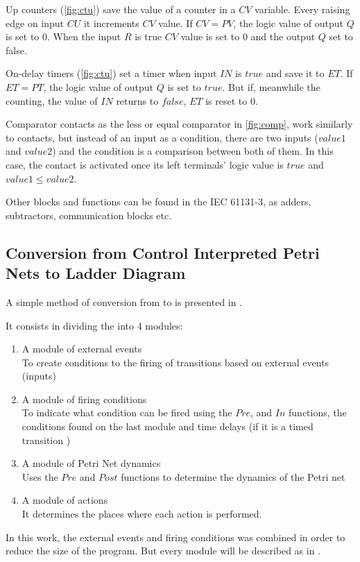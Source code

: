 Up counters (\autoref{fig:ctu}) save the value of a counter in a $CV$ variable. Every raising edge
on input $CU$ it increments $CV$ value. If $CV=PV$, the logic value of output $Q$ 
is set to $0$. When the input $R$ is true $CV$ value is set to $0$ and the
output $Q$ set to false.

On-delay timers (\autoref{fig:ctu}) set a timer when input $IN$ is $true$
and save it to $ET$. If $ET=PT$, the logic value of output $Q$ is set to $true$.
But if, meanwhile the counting, the value of $IN$ returns to $false$, $ET$ is reset to
$0$.

Comparator contacts as the less or equal comparator in \autoref{fig:comp}, work
similarly to contacts, but instead of an input as a condition, there are two
inputs ($value1$ and $value2$) and the condition is a comparison between both of
them. In this case, the contact is activated once its left terminals' logic
value is $true$ and $value1\leq value2$.

Other blocks and functions can be found in the IEC 61131-3, as adders,
subtractors, communication blocks etc.

\subsection{Conversion from Control Interpreted Petri Nets to Ladder Diagram}
\label{sec:cipnToLD}

A simple method of conversion from \CIPN{} to \LD{} is presented in
\cite{moreira2013bridging}.

It consists in dividing the \CIPN{} into 4 modules:
\begin{enumerate}
\item A module of external events\\
  To create conditions to the firing of transitions based on external events
  (inputs)
\item A module of firing conditions\\
  To indicate what condition can be fired using the $Pre$, and $In$ functions, the conditions found on the
  last module and time delays (if it is a timed transition 
 )
\item A module of Petri Net dynamics\\
Uses the $Pre$ and $Post$ functions to determine the dynamics of the Petri net
\item A module of actions\\
  It determines the places where each action is performed.
\end{enumerate}
In this work, the external events and firing conditions was combined in order to
reduce the size of the program. But every module will be described as in
\cite{moreira2013bridging}.

